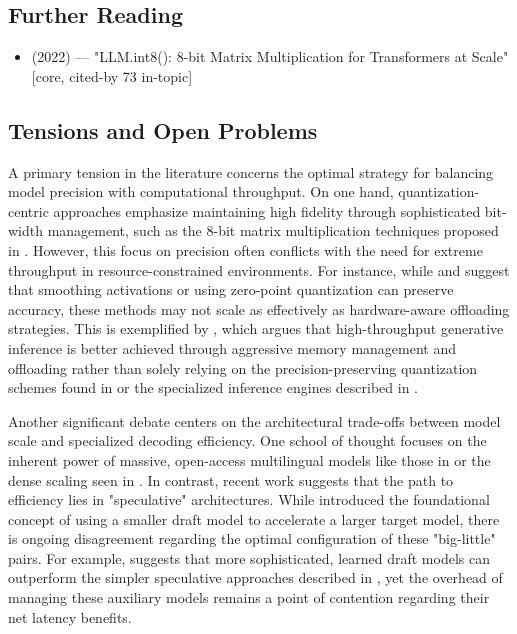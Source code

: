 \documentclass[11pt]{article}
\begin{document}
\subsection{Further Reading}

\begin{itemize}
  \item \citep{2208.07339} (2022) — "LLM.int8(): 8-bit Matrix Multiplication for Transformers at Scale" [core, cited-by 73 in-topic]
\end{itemize}

\subsection{Tensions and Open Problems}

A primary tension in the literature concerns the optimal strategy for balancing model precision with computational throughput. On one hand, quantization-centric approaches emphasize maintaining high fidelity through sophisticated bit-width management, such as the 8-bit matrix multiplication techniques proposed in \citep{2208.07339}. However, this focus on precision often conflicts with the need for extreme throughput in resource-constrained environments. For instance, while \citep{2211.10438} and \citep{2206.01861} suggest that smoothing activations or using zero-point quantization can preserve accuracy, these methods may not scale as effectively as hardware-aware offloading strategies. This is exemplified by \citep{2303.06865}, which argues that high-throughput generative inference is better achieved through aggressive memory management and offloading rather than solely relying on the precision-preserving quantization schemes found in \citep{2208.07339} or the specialized inference engines described in \citep{2207.00032}.

Another significant debate centers on the architectural trade-offs between model scale and specialized decoding efficiency. One school of thought focuses on the inherent power of massive, open-access multilingual models like those in \citep{2211.05100} or the dense scaling seen in \citep{2205.01068}. In contrast, recent work suggests that the path to efficiency lies in "speculative" architectures. While \citep{2211.17192} introduced the foundational concept of using a smaller draft model to accelerate a larger target model, there is ongoing disagreement regarding the optimal configuration of these "big-little" pairs. For example, \citep{2302.07863} suggests that more sophisticated, learned draft models can outperform the simpler speculative approaches described in \citep{2302.01318}, yet the overhead of managing these auxiliary models remains a point of contention regarding their net latency benefits.
\end{document}
